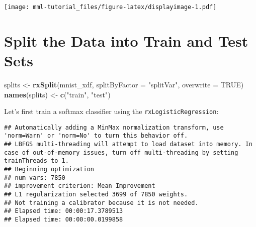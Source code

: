 \documentclass[]{book}
\newenvironment{Shaded}{\begin{snugshade}}{\end{snugshade}}
\newcommand{\KeywordTok}[1]{\textcolor[rgb]{0.13,0.29,0.53}{\textbf{#1}}}
\newcommand{\DataTypeTok}[1]{\textcolor[rgb]{0.13,0.29,0.53}{#1}}
\newcommand{\StringTok}[1]{\textcolor[rgb]{0.31,0.60,0.02}{#1}}
\newcommand{\OtherTok}[1]{\textcolor[rgb]{0.56,0.35,0.01}{#1}}
\newcommand{\OperatorTok}[1]{\textcolor[rgb]{0.81,0.36,0.00}{\textbf{#1}}}
\newcommand{\NormalTok}[1]{#1}
\theoremstyle{definition}
\theoremstyle{definition}
\theoremstyle{definition}
\theoremstyle{remark}
\begin{document}
\texttt{[image: mml-tutorial\_files/figure-latex/displayimage-1.pdf]}

\section{Split the Data into Train and Test
Sets}\label{split-the-data-into-train-and-test-sets}

\begin{Shaded}
\begin{Highlighting}[]
\NormalTok{splits <-}\StringTok{ }\KeywordTok{rxSplit}\NormalTok{(mnist_xdf,}
                  \DataTypeTok{splitByFactor =} \StringTok{"splitVar"}\NormalTok{, }
                  \DataTypeTok{overwrite =} \OtherTok{TRUE}\NormalTok{)}
\KeywordTok{names}\NormalTok{(splits) <-}\StringTok{ }\KeywordTok{c}\NormalTok{(}\StringTok{"train"}\NormalTok{, }\StringTok{"test"}\NormalTok{)}
\end{Highlighting}
\end{Shaded}

Let's first train a softmax classifier using the
\texttt{rxLogisticRegression}:

\begin{Shaded}
\end{Shaded}

\begin{verbatim}
## Automatically adding a MinMax normalization transform, use 'norm=Warn' or 'norm=No' to turn this behavior off.
## LBFGS multi-threading will attempt to load dataset into memory. In case of out-of-memory issues, turn off multi-threading by setting trainThreads to 1.
## Beginning optimization
## num vars: 7850
## improvement criterion: Mean Improvement
## L1 regularization selected 3699 of 7850 weights.
## Not training a calibrator because it is not needed.
## Elapsed time: 00:00:17.3789513
## Elapsed time: 00:00:00.0199858
\end{verbatim}
\end{document}
